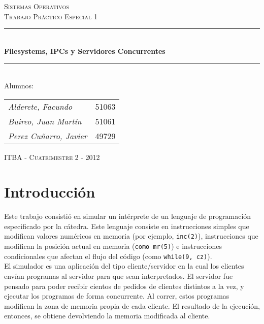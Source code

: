 \documentclass[a4paper, 10pt]{article}
\newcommand{\HRule}{\rule{\linewidth}{0.5mm}}
\begin{document}
\begin{titlepage}
\begin{center}

\textsc{\LARGE Sistemas Operativos}\\[1.5cm]
\textsc{\Large Trabajo Práctico Especial 1}\\[0.5cm]

\HRule \\[0.4cm]
 {\huge \bfseries Filesystems, IPCs y Servidores Concurrentes}\\[0.4cm]
\HRule \\[1.5cm]


\Large Alumnos: \\ [0.25cm]
\begin{tabular}{l @{\ \ -\ \ }l}

\emph{\Large Alderete, Facundo} & \Large 51063\\[0.2cm]
\emph{\Large Buireo, Juan Martín} & \Large 51061\\[0.2cm]
\emph{\Large Perez Cuñarro, Javier} & \Large 49729\\[0.2cm]

\end{tabular}

\vspace{9cm}

\textsc{\Large ITBA - Cuatrimestre 2 - 2012}
\vspace{4cm}

\end{center}
\end{titlepage}

\clearpage


\tableofcontents
\clearpage

\section{Introducción}

Este trabajo consistió en simular un intérprete de un lenguaje de programación especificado por la cátedra. Este lenguaje consiste en instrucciones simples que modifican valores numéricos en memoria (por ejemplo, {\tt inc(2)}), instrucciones que modifican la posición actual en memoria ({\tt como mr(5)}) e instrucciones condicionales que afectan el flujo del código (como {\tt while(9, cz)}).\\

El simulador es una aplicación del tipo cliente/servidor en la cual los clientes envían programas al servidor para que sean interpretados. El servidor fue pensado para poder recibir cientos de pedidos de clientes distintos a la vez, y ejecutar los programas de forma concurrente. Al correr, estos programas modifican la zona de memoria propia de cada cliente. El resultado de la ejecución, entonces, se obtiene devolviendo la memoria modificada al cliente.\\
\end{document}
